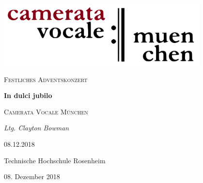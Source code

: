 \documentclass[11pt, ngermanm, titlepage]{article}
\begin{document}
	\begin{titlepage}

	\centering
	\includegraphics[width=0.8\textwidth]{img/cvlogo.png}\par\vspace{2cm}
	
	{\scshape\Large Festliches Adventskonzert\par}
	\vspace{1.5cm}
	{\huge\bfseries In dulci jubilo\par}
	\vspace{1.5cm}
	{\scshape\LARGE Camerata Vocale München\par}
	\vspace{1cm}
	{\Large\itshape Ltg. Clayton Bowman\par}
	\vfill
	08.12.2018\par
	Technische Hochschule Rosenheim
	
	\vfill
	
	{\large{08. Dezember 2018}\par}


	\end{titlepage}

	\pagebreak
	\quad
	\pagebreak
\end{document}

